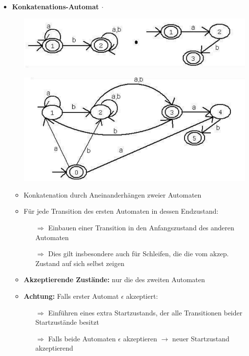 \documentclass[11pt,a4paper]{article}
\begin{document}
\begin{itemize}
\begin{itemize}
	\end{itemize}
	
\item {\large \textbf{Konkatenations-Automat $\cdot$}}
	\begin{itemize}
	
	\item[]
		\begin{center}
		\includegraphics[width=12cm]{konkat1}
		\end{center}			
	
	\item[]
		\begin{center}
		\includegraphics[width=12cm]{konkat2}
		\end{center}	
	
	\item Konkatenation durch Aneinanderhängen zweier Automaten
	\item Für jede Transition des ersten Automaten in dessen Endzustand:
		\begin{itemize}
		\item[$\Rightarrow$] Einbauen einer Transition in den Anfangszustand des anderen Automaten
		\item[$\Rightarrow$] Dies gilt insbesondere auch für Schleifen, die die vom akzep. Zustand auf sich selbst zeigen
		\end{itemize}
	\item \textbf{Akzeptierende Zustände:} nur die des zweiten Automaten
	\item \textbf{Achtung:} Falls erster Automat $\epsilon$ akzeptiert:
		\begin{itemize}
		\item[$\Rightarrow$] Einführen eines extra Startzustands, der alle Transitionen beider Startzustände besitzt
		\item[$\Rightarrow$] Falls beide Automaten $\epsilon$ akzeptieren  $\rightarrow$ neuer Startzustand akzeptierend 
		\end{itemize}
		

\end{itemize}
\end{itemize}
\end{document}
